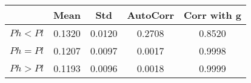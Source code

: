 \begin{tiny}\begin{tabular}{|l|c|c|c|c|}
\hline
&\textbf{Mean}&\textbf{Std}&\textbf{AutoCorr}&\textbf{Corr with g}\\\hline
\textbf{$Ph<Pl$}&0.1320&0.0120&0.2708&0.8520\\\hline
\textbf{$Ph=Pl$}&0.1207&0.0097&0.0017&0.9998\\\hline
\textbf{$Ph>Pl$}&0.1193&0.0096&0.0018&0.9999\\\hline
\end{tabular}
\end{tiny}